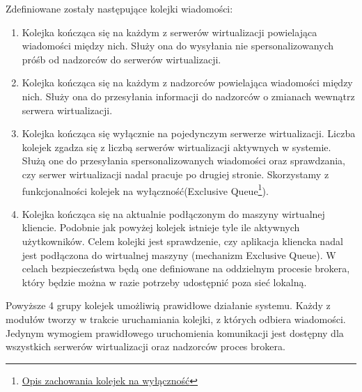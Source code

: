 \documentclass[../opis-rozwiazania.tex]{subfiles}
\begin{document}
Zdefiniowane zostały następujące kolejki wiadomości:
\begin{enumerate}[label=(\Roman*)]
    \item \label{-modules:broker:queue-virtsrv} Kolejka kończąca się na każdym z serwerów wirtualizacji powielająca wiadomości między nich.
          Służy ona do wysyłania nie spersonalizowanych próśb od nadzorców do serwerów wirtualizacji.
    \item \label{modules:broker:queue-overseers} Kolejka kończąca się na każdym z nadzorców powielająca wiadomości między nich.
          Służy ona do przesyłania informacji do nadzorców o zmianach wewnątrz serwera wirtualizacji.
    \item \label{modules:broker:queue-exclusive} Kolejka kończąca się wyłącznie na pojedynczym serwerze wirtualizacji.
          Liczba kolejek zgadza się z liczbą serwerów wirtualizacji aktywnych w systemie.
          Służą one do przesyłania spersonalizowanych wiadomości oraz sprawdzania, czy serwer wirtualizacji nadal pracuje po drugiej stronie.
          Skorzystamy z funkcjonalności kolejek na wyłączność(Exclusive Queue\footnote{\href{https://www.rabbitmq.com/queues.html\#exclusive-queues}{Opis zachowania kolejek na wyłączność}}).
    \item \label{modules:broker:queue-users} Kolejka kończąca się na aktualnie podłączonym do maszyny wirtualnej kliencie.
          Podobnie jak powyżej kolejek istnieje tyle ile aktywnych użytkowników.
          Celem kolejki jest sprawdzenie, czy aplikacja kliencka nadal jest podłączona do wirtualnej maszyny (mechanizm Exclusive Queue).
          W celach bezpieczeństwa będą one definiowane na oddzielnym procesie brokera, który będzie można w razie potrzeby udostępnić poza sieć lokalną.
\end{enumerate}

Powyższe 4 grupy kolejek umożliwią prawidłowe działanie systemu.
Każdy z modułów tworzy w trakcie uruchamiania kolejki, z których odbiera wiadomości.
Jedynym wymogiem prawidłowego uruchomienia komunikacji jest dostępny dla wszystkich serwerów wirtualizacji oraz nadzorców proces brokera.

\end{document}

